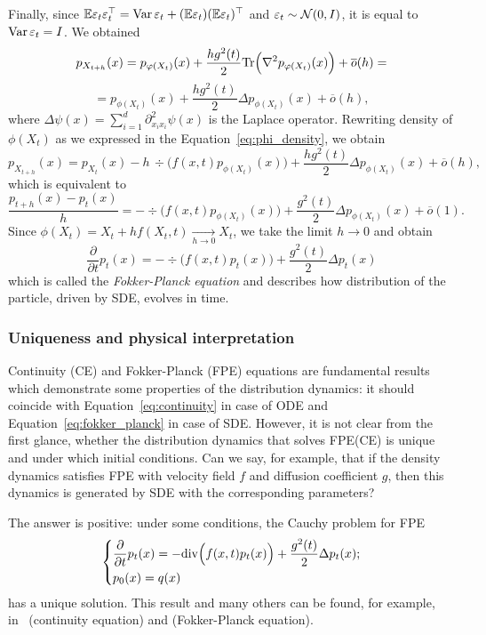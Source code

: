 Finally, since $\E \eps_t \eps_t^\top = \Var \,\eps_t + (\E \eps_t )(\E \eps_t)^\top$ and $\eps_t \sim \mathcal{N}(0, I)$, it is equal to $\Var \, \eps_t = I$. We obtained
\[
    p_{X_{t + h}}(x) = p_{\phi(X_t)}(x) + \frac{h g^2(t)}{2} \Tr\Big(\nabla^2 p_{\phi(X_t)}(x)\Big) + \overline{o}(h) =
\]
\[
    = p_{\phi(X_t)}(x) + \frac{h g^2(t)}{2} \Delta p_{\phi(X_t)}(x) + \overline{o}(h),
\]
where $\Delta \psi(x) = \sum_{i = 1}^{d} \partial^2_{x_i x_i} \psi(x)$ is the Laplace operator. Rewriting density of $\phi(X_t)$ as we expressed in the Equation~\ref{eq:phi_density}, we obtain
\[
    p_{X_{t + h}}(x) = p_{X_t}(x) - h \, \div\Big(f(x, t) p_{\phi(X_t)}(x)\Big) + \frac{h g^2(t)}{2} \Delta p_{\phi(X_t)}(x) +  \overline{o}(h),
\]
which is equivalent to
\[
    \frac{p_{t + h}(x) - p_{t}(x)}{h} = -\div \Big(f(x, t) p_{\phi(X_t)}(x) \Big) + \frac{g^2(t)}{2} \Delta p_{\phi(X_t)}(x) + \overline{o}(1).
\]
Since $\phi(X_t) = X_t + h f(X_t, t) \xrightarrow[h \rightarrow 0]{} X_t$, we take the limit $h \rightarrow 0$ and obtain
\begin{equation}\label{eq:fokker_planck}
    \boxed{\frac{\partial}{\partial t} p_t(x) = -\div \Big(f(x, t) p_{t}(x)\Big) + \frac{g^2(t)}{2} \Delta p_t(x)}
\end{equation}
which is called the \emph{Fokker-Planck equation} and describes how distribution of the particle, driven by SDE, evolves in time.

\subsubsection{Uniqueness and physical interpretation}
\label{sec:fpe_unique}
Continuity (CE) and Fokker-Planck (FPE) equations are fundamental results which demonstrate some properties of the distribution dynamics: it should coincide with Equation~\ref{eq:continuity} in case of ODE and Equation~\ref{eq:fokker_planck} in case of SDE. However, it is not clear from the first glance, whether the distribution dynamics that solves FPE(CE) is unique and under which initial conditions. Can we say, for example, that if the density dynamics satisfies FPE with velocity field $f$ and diffusion coefficient $g$, then this dynamics is generated by SDE with the corresponding parameters?

The answer is positive: under some conditions, the Cauchy problem for FPE
\begin{equation}\label{eq:cauchy_fpe}
    \begin{dcases}
        \frac{\partial}{\partial t} p_t(x) = -\div\Big(f(x, t)p_t(x)\Big) + \frac{g^2(t)}{2} \Delta p_t(x);\\
        p_0(x) = q(x)
    \end{dcases}
\end{equation}
has a unique solution. This result and many others can be found, for example, in~\cite{ambrosio2005gradient} (continuity equation) and \cite{bogachev2021uniqueness, bogachev2022fokker} (Fokker-Planck equation).

